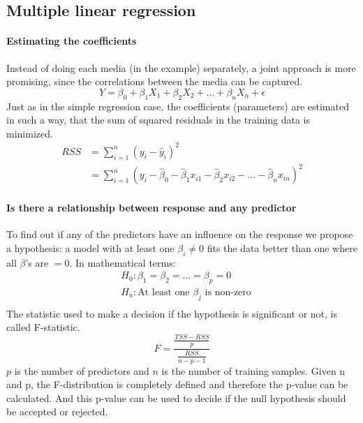 \documentclass[../document.tex]{subfiles}
\begin{document}
	\subsection{Multiple linear regression}

	\paragraph{Estimating the coefficients}
	Instead of doing each media (in the example) separately, a joint approach is more promising, since the correlations between the media can be captured.
	\begin{equation}
		Y = \beta_{0}+\beta_{1}X_{1}+\beta_{2}X_{2}+...+\beta_{n}X_{n}+\epsilon
	\end{equation}
	Just as in the simple regression case, the coefficients (parameters) are estimated in such a way, that the sum of squared residuals in the training data is minimized.
	\begin{equation}
	\begin{split}
		RSS &= \sum_{i=1}^{n}(y_{i}-\hat{y}_{i})^2\\
			&= \sum_{i=1}^{n}(y_{i}-\hat{\beta}_{0}-\hat{\beta}_{1}x_{i1}-\hat{\beta}_{2}x_{i2}-...-\hat{\beta}_{n}x_{in})^2
	\end{split}
	\end{equation}

	\paragraph{Is there a relationship between response and any predictor}
	To find out if any of the predictors have an influence on the response we propose a hypothesis: a model with at least one $\beta_i \ne 0$ fits the data better than one where all $\beta$'s are $=0$. In mathematical terms:
	\begin{equation}
	\begin{split}
		&H_{0}:\beta_{1}=\beta_{2}=...=\beta_{p}=0\\
		&H_{a}:\text{At least one }\beta_{j}\text{ is non-zero}\\
	\end{split}
	\end{equation}
	The statistic used to make a decision if the hypothesis is significant or not, is called F-statistic.
	\begin{equation}
		F = \frac{\frac{TSS-RSS}{p}}{\frac{RSS}{n-p-1}}
	\end{equation}
	\(p\) is the number of predictors and \(n\) is the number of training samples.
	Given n and p, the F-distribution is completely defined and therefore the p-value can be calculated. And this p-value can be used to decide if the null hypothesis should be accepted or rejected.
\end{document}
